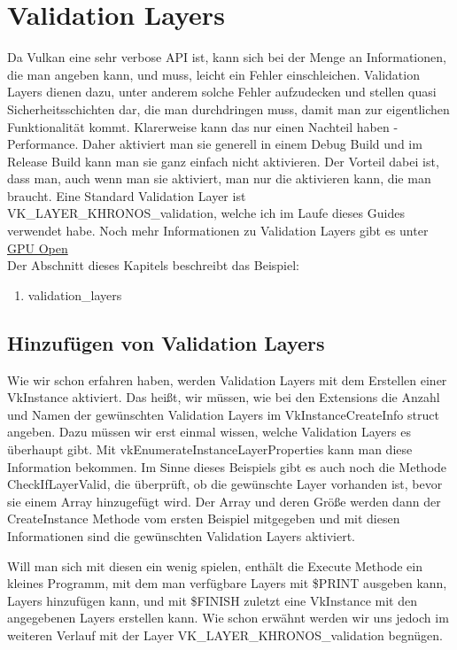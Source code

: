 \documentclass[11pt,a4paper]{report}
\begin{document}
\chapter{Validation Layers}
Da Vulkan eine sehr verbose API ist, kann sich bei der Menge an Informationen, die man angeben kann, und muss, leicht ein Fehler einschleichen. Validation Layers dienen dazu, unter anderem solche Fehler aufzudecken und stellen quasi Sicherheitsschichten dar, die man durchdringen muss, damit man zur eigentlichen Funktionalität kommt. Klarerweise kann das nur einen Nachteil haben - Performance. Daher aktiviert man sie generell in einem Debug Build und im Release Build kann man sie ganz einfach nicht aktivieren. Der Vorteil dabei ist, dass man, auch wenn man sie aktiviert, man nur die aktivieren kann, die man braucht. Eine Standard Validation Layer ist VK\_LAYER\_KHRONOS\_validation, welche ich im Laufe dieses Guides verwendet habe. Noch mehr Informationen zu Validation Layers gibt es unter \href{https://gpuopen.com/using-the-vulkan-validation-layers/}{GPU Open}\\
Der Abschnitt dieses Kapitels beschreibt das Beispiel:
\begin{enumerate}
	\item validation\_layers
\end{enumerate}

\section{Hinzufügen von Validation Layers}
Wie wir schon erfahren haben, werden Validation Layers mit dem Erstellen einer VkInstance aktiviert. Das heißt, wir müssen, wie bei den Extensions die Anzahl und Namen der gewünschten Validation Layers im VkInstanceCreateInfo struct angeben. Dazu müssen wir erst einmal wissen, welche Validation Layers es überhaupt gibt. Mit vkEnumerateInstanceLayerProperties kann man diese Information bekommen. Im Sinne dieses Beispiels gibt es auch noch die Methode CheckIfLayerValid, die überprüft, ob die gewünschte Layer vorhanden ist, bevor sie einem Array hinzugefügt wird. Der Array und deren Größe werden dann der CreateInstance Methode vom ersten Beispiel mitgegeben und mit diesen Informationen sind die gewünschten Validation Layers aktiviert.

Will man sich mit diesen ein wenig spielen, enthält die Execute Methode ein kleines Programm, mit dem man verfügbare Layers mit \$PRINT ausgeben kann, Layers hinzufügen kann, und mit \$FINISH zuletzt eine VkInstance mit den angegebenen Layers erstellen kann. Wie schon erwähnt werden wir uns jedoch im weiteren Verlauf mit der Layer VK\_LAYER\_KHRONOS\_validation begnügen.
\end{document}
